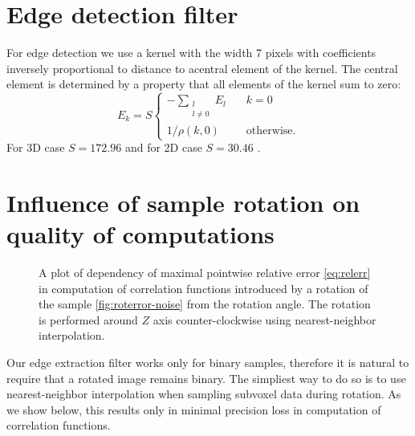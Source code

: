 \documentclass[reprint,amsmath,amssymb,aps,pre,showkeys,showpacs]{revtex4-1}
\begin{document}
\section{Edge detection filter}
\label{sec:filter}
For edge detection we use a kernel with the width 7 pixels with coefficients
inversely proportional to distance to acentral element of the kernel. The
central element is determined by a property that all elements of the kernel sum
to zero:
\begin{equation}
  E_k = S \left\{
  \begin{array}{ll}
    -\sum\limits_{\substack{l \\ l \ne 0}} E_l & \quad k = 0 \\
    1 / \rho(k, 0) & \quad \text{otherwise.}
  \end{array}
  \right.
\end{equation}
For 3D case $S=172.96$ and for 2D case $S=30.46$ \cite{postnicov20232}.

\section{Influence of sample rotation on quality of computations}
\label{sec:rotqua}
\begin{figure}[tp]
  \centering
  \hfill
  \caption[]{A plot of dependency of maximal pointwise relative error
    \cref{eq:relerr} in computation of correlation functions introduced by a
    rotation of the sample \cref{fig:roterror-noise} from the rotation
    angle. The rotation is performed around $Z$ axis counter-clockwise using
    nearest-neighbor interpolation.}
  \label{fig:roterror}
\end{figure}
Our edge extraction filter works only for binary samples, therefore it is
natural to require that a rotated image remains binary. The simpliest way to do
so is to use nearest-neighbor interpolation when sampling subvoxel data during
rotation. As we show below, this results only in minimal precision loss in
computation of correlation functions.
\end{document}
